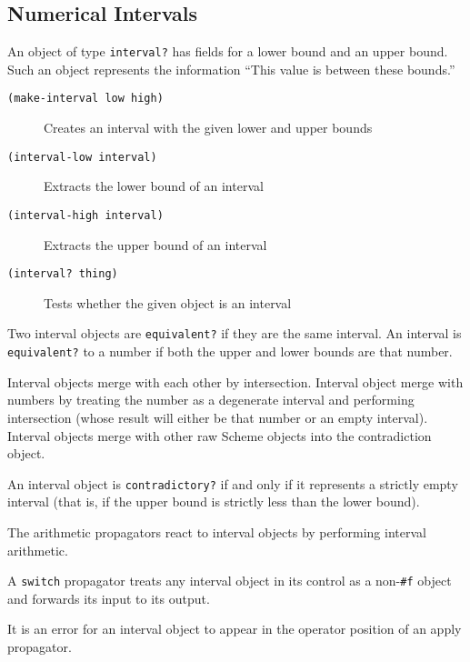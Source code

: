 \documentclass[12pt,letterpaper,english]{article}
\begin{document}
\hypertarget{numerical-intervals}{}
\subsection{Numerical Intervals}
\label{numerical-intervals}

An object of type \texttt{interval?} has fields for a lower bound and an
upper bound.  Such an object represents the information ``This value is
between these bounds.''
\begin{description}
\item[{\texttt{(make-interval low high)}}] \leavevmode 
Creates an interval with the given lower and upper bounds

\item[{\texttt{(interval-low interval)}}] \leavevmode 
Extracts the lower bound of an interval

\item[{\texttt{(interval-high interval)}}] \leavevmode 
Extracts the upper bound of an interval

\item[{\texttt{(interval? thing)}}] \leavevmode 
Tests whether the given object is an interval

\end{description}

Two interval objects are \texttt{equivalent?} if they are the same
interval.  An interval is \texttt{equivalent?} to a number if both the
upper and lower bounds are that number.

Interval objects merge with each other by intersection.  Interval
object merge with numbers by treating the number as a degenerate
interval and performing intersection (whose result will either be that
number or an empty interval).  Interval objects merge with other
raw Scheme objects into the contradiction object.

An interval object is \texttt{contradictory?} if and only if it represents
a strictly empty interval (that is, if the upper bound is strictly
less than the lower bound).

The arithmetic propagators react to interval objects by performing
interval arithmetic.

A \texttt{switch} propagator treats any interval object in its control as a
non-\texttt{{\#}f} object and forwards its input to its output.

It is an error for an interval object to appear in the operator
position of an apply propagator.
\end{document}
